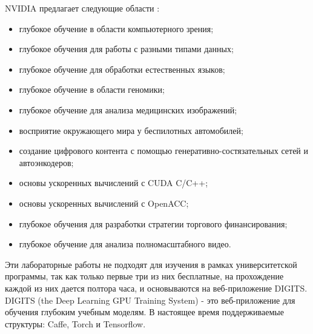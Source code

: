 NVIDIA предлагает следующие области \cite{NVIDIA}:
\begin{itemize}
\item глубокое обучение в области компьютерного зрения;
\item глубокое обучения для работы с разными типами данных;
\item глубокое обучение для обработки естественных языков;
\item глубокое обучение в области геномики;
\item глубокое обучение для анализа медицинских изображений;
\item восприятие окружающего мира у беспилотных автомобилей;
\item создание цифрового контента с помощью генеративно-состязательных сетей и автоэнкодеров;
\item основы ускоренных вычислений с CUDA C/C++;
\item основы ускоренных вычислений с OpenACC;
\item глубокое обучения для разработки стратегии торгового финансирования;
\item глубокое обучение для анализа полномасштабного видео.
\end{itemize}

Эти лабораторные работы не подходят для изучения в рамках университетской программы, так как только первые три из них  бесплатные, на прохождение каждой из них дается полтора часа, и основываются на  веб-приложение DIGITS. DIGITS (the Deep Learning GPU Training System) - это веб-приложение для обучения глубоким учебным моделям. В настоящее время поддерживаемые структуры: Caffe, Torch и Tensorflow. 